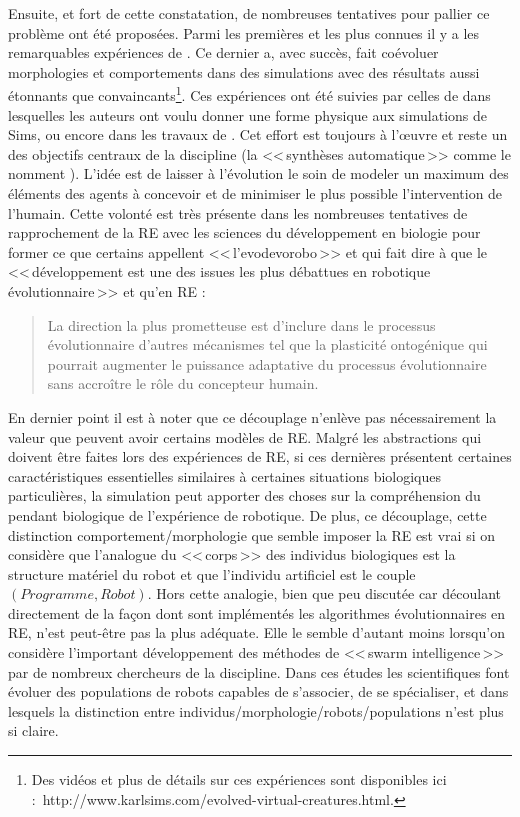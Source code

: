 Ensuite, et fort de cette constatation, de nombreuses tentatives pour pallier ce problème ont été proposées. Parmi les premières et les plus connues il y a les remarquables expériences de \cite{sims1994evolving3dmorphologyandbehaviorbycompetition}. Ce dernier a, avec succès, fait coévoluer morphologies et comportements dans des simulations avec des résultats aussi étonnants que convaincants\footnote{Des vidéos et plus de détails sur ces expériences sont disponibles ici : http://www.karlsims.com/evolved-virtual-creatures.html.}. Ces expériences ont été suivies par celles de \cite{pollack2000thegolemproject} dans lesquelles les auteurs ont voulu donner une forme physique aux simulations de Sims, ou encore dans les travaux de \citet[ch. 6]{pfeifer2006howthebodyshapesthewaywethink}.
Cet effort est toujours à l'œuvre et reste un des objectifs centraux de la discipline (la <<\,synthèses automatique\,>> comme le nomment \cite{doncieux2009exploringnewhorizonsinevolutionqryrobotics}). L'idée est de laisser à l'évolution le soin de modeler un maximum des éléments des agents à concevoir et de minimiser le plus possible l'intervention de l'humain. Cette volonté est très présente dans les nombreuses tentatives de rapprochement de la RE avec les sciences du développement en biologie pour former ce que certains appellent <<\,l'evodevorobo\,>> \citep{bredeche11evolutionaryadaptationpopulationrobots} et qui fait dire à \citet[p. 17]{nolfi00evolrobobiolintetechselfmach} que le <<\,développement est une des issues les plus débattues en robotique évolutionnaire\,>> et qu'en RE :
\begin{quotation}
La direction la plus prometteuse est d'inclure dans le processus évolutionnaire d'autres mécanismes tel que la plasticité ontogénique qui pourrait augmenter le puissance adaptative du processus évolutionnaire sans accroître le rôle du concepteur humain.
\end{quotation}

En dernier point il est à noter que ce découplage n'enlève pas nécessairement la valeur que peuvent avoir certains modèles de RE. Malgré les abstractions qui doivent être faites lors des expériences de RE, si ces dernières présentent certaines caractéristiques essentielles similaires à certaines situations biologiques particulières, la simulation peut apporter des choses sur la compréhension du pendant biologique de l'expérience de robotique. De plus, ce découplage, cette distinction comportement/morphologie que semble imposer la RE est vrai si on considère que l'analogue du <<\,corps\,>> des individus biologiques est la structure matériel du robot et que l'individu artificiel est le couple $(Programme,Robot)$. Hors cette analogie, bien que peu discutée car découlant directement de la façon dont sont implémentés les algorithmes évolutionnaires en RE, n'est peut-être pas la plus adéquate. Elle le semble d'autant moins lorsqu'on considère l'important développement des méthodes de <<\,swarm intelligence\,>> par de nombreux chercheurs de la discipline. Dans ces études les scientifiques font évoluer des populations de robots capables de s'associer, de se spécialiser, et dans lesquels la distinction entre individus/morphologie/robots/populations n'est plus si claire.

